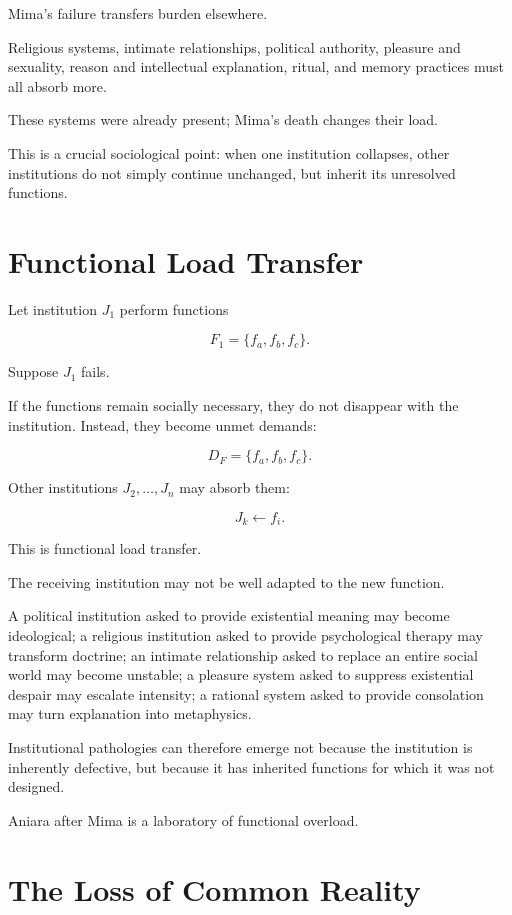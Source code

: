 \documentclass[11pt,oneside]{book}
\theoremstyle{definition}
\theoremstyle{remark}
\begin{document}
Mima's failure transfers burden elsewhere.

Religious systems, intimate relationships, political authority, pleasure and sexuality, reason and intellectual explanation, ritual, and memory practices must all absorb more.

These systems were already present; Mima's death changes their load.

This is a crucial sociological point: when one institution collapses, other institutions do not simply continue unchanged, but inherit its unresolved functions.

\section{Functional Load Transfer}

Let institution \(J_1\) perform functions

\[
F_1=\{f_a,f_b,f_c\}.
\]

Suppose \(J_1\) fails.

If the functions remain socially necessary, they do not disappear with the institution. Instead, they become unmet demands:

\[
D_F
=
\{f_a,f_b,f_c\}.
\]

Other institutions \(J_2,\ldots,J_n\) may absorb them:

\[
J_k
\leftarrow
f_i.
\]

This is functional load transfer.

The receiving institution may not be well adapted to the new function.

A political institution asked to provide existential meaning may become ideological; a religious institution asked to provide psychological therapy may transform doctrine; an intimate relationship asked to replace an entire social world may become unstable; a pleasure system asked to suppress existential despair may escalate intensity; a rational system asked to provide consolation may turn explanation into metaphysics.

Institutional pathologies can therefore emerge not because the institution is inherently defective, but because it has inherited functions for which it was not designed.

Aniara after Mima is a laboratory of functional overload.

\section{The Loss of Common Reality}
\end{document}
